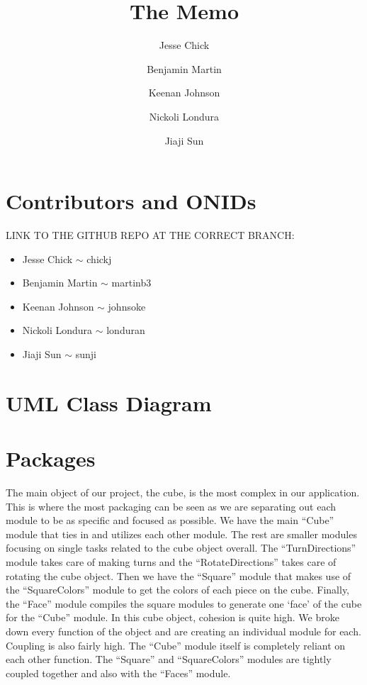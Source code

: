 \documentclass[12pt]{article}
\title{The Memo}
\author{Jesse Chick\\
\and Benjamin Martin\\
\and Keenan Johnson\\
\and Nickoli Londura\\
\and Jiaji Sun}
\begin{document}
\maketitle
\tableofcontents

\section{Contributors and ONIDs}
\par
LINK TO THE GITHUB REPO AT THE CORRECT BRANCH: 

\begin{itemize}
	\item Jesse Chick $\sim$ chickj
	\item Benjamin Martin $\sim$ martinb3
	\item Keenan Johnson $\sim$ johnsoke
	\item Nickoli Londura $\sim$ londuran
	\item Jiaji Sun $\sim$ sunji
\end{itemize}

\section{UML Class Diagram}

\section{Packages}

\par
The main object of our project, the cube, is the most complex  in our application. This is where the most packaging can be seen as we are separating out each module to be as specific and focused as possible. We have the main “Cube” module that ties in and utilizes each other module. The rest are smaller modules focusing on single tasks related to the cube object overall. The “TurnDirections” module takes care of making turns and the “RotateDirections” takes care of rotating the cube object. Then we have the “Square” module that makes use of the “SquareColors” module to get the colors of each piece on the cube. Finally, the “Face” module compiles the square modules to generate one ‘face’ of the cube for the “Cube” module. In this cube object, cohesion is quite high. We broke down every function of the object and are creating an individual module for each. Coupling is also fairly high. The “Cube” module itself is completely reliant on each other function. The “Square” and “SquareColors” modules are tightly coupled together and also with the “Faces” module. \\
\end{document}
